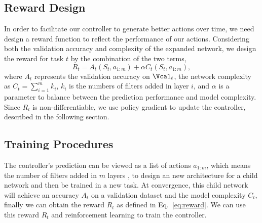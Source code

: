 \documentclass{article}
\begin{document}
\subsection{Reward Design}
\label{sec:reward}
In order to facilitate  our controller to generate better actions over time, we need design a reward function to reflect the performance of our actions.  Considering both the validation accuracy and complexity of the expanded network, we design the reward for task $t$ by the combination of the two terms,
\begin{equation}
R_t = A_t(S_t,a_{1:m})  + \alpha C_t(S_t,a_{1:m}), \label{eq:reward}
\end{equation}
where $A_t$ represents the validation accuracy on $\Vcal_t$, the network complexity as $C_t = \sum\limits_{i=1}^m k_i$, $k_i$ is the numbers of filters added in layer $i$, and $\alpha$ is a parameter to balance between the prediction performance and model complexity.
Since $R_t$ is non-differentiable, we use policy gradient to update the controller, described in the following section.

\subsection{Training Procedures}

The controller's prediction can be viewed as a list of actions $a_{1:m}$, which means the number of filters added in $m$ layers , to design an
new architecture for a child network and then be trained in a new task. At convergence, this child network will achieve an accuracy $A_t$ on
a validation dataset and the model complexity $C_t$, finally we can obtain the reward $R_t$ as defined in Eq.~\eqref{eq:reward}. We can use this reward $R_t$ and reinforcement learning
to train the controller.
\end{document}
